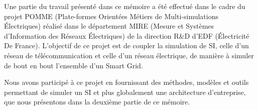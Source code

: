 Une partie du travail présenté dans ce mémoire a été effectué dans le cadre du projet
POMME (Plate-formes Orientées Métiers de Multi-simulations Électriques) 
réalisé dans le département MIRE (Mesure et Systèmes d'Information des Réseaux Électriques) 
de la direction R\&D d'EDF (Électricité De France). L'objectif de ce projet est de coupler la simulation de SI, celle d'un
réseau de télécommunication et celle d'un réseau électrique, de manière à simuler de bout en bout l'ensemble d'un Smart Grid.

Nous avons participé à ce projet en fournissant des méthodes, modèles et outils
permettant de simuler un SI et plus globalement une architecture
d'entreprise, que nous présentons dans la deuxième partie de ce mémoire. 



